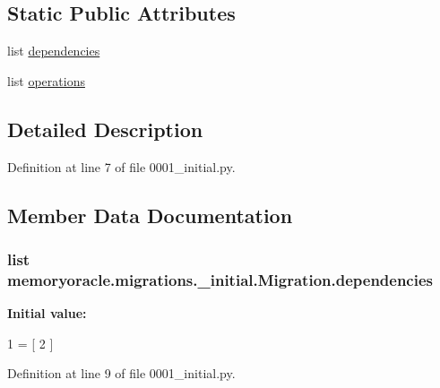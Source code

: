 \subsection*{Static Public Attributes}
\begin{DoxyCompactItemize}
\item 
list \hyperlink{classmemoryoracle_1_1migrations_1_10001__initial_1_1Migration_a3ff2aefbf50b58399b7b2f0ef31a06f3}{dependencies}
\item 
list \hyperlink{classmemoryoracle_1_1migrations_1_10001__initial_1_1Migration_a4463b1b5eba273e3ad8c7a9c48453262}{operations}
\end{DoxyCompactItemize}


\subsection{Detailed Description}


Definition at line 7 of file 0001\+\_\+initial.\+py.



\subsection{Member Data Documentation}
\hypertarget{classmemoryoracle_1_1migrations_1_10001__initial_1_1Migration_a3ff2aefbf50b58399b7b2f0ef31a06f3}{}
\subsubsection[{dependencies}]{\setlength{\rightskip}{0pt plus 5cm}list memoryoracle.\+migrations.\+\_\+initial.\+Migration.\+dependencies\hspace{0.3cm}{\ttfamily [static]}}\label{classmemoryoracle_1_1migrations_1_10001__initial_1_1Migration_a3ff2aefbf50b58399b7b2f0ef31a06f3}
{\bfseries Initial value\+:}
\begin{DoxyCode}
1 = [
2     ]
\end{DoxyCode}


Definition at line 9 of file 0001\+\_\+initial.\+py.

\hypertarget{classmemoryoracle_1_1migrations_1_10001__initial_1_1Migration_a4463b1b5eba273e3ad8c7a9c48453262}{}
